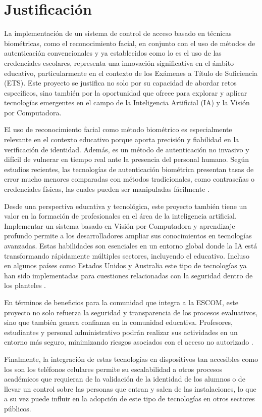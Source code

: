 

\section{Justificación}

La implementación de un sistema de control de acceso basado en técnicas biométricas, como el reconocimiento facial, en conjunto con el uso de métodos de autenticación convencionales y ya establecidos como lo es el uso de las credenciales escolares, representa una innovación significativa en el ámbito educativo, particularmente en el contexto de los Exámenes a Título de Suficiencia (ETS). Este proyecto se justifica no solo por su capacidad de abordar retos específicos, sino también por la oportunidad que ofrece para explorar y aplicar tecnologías emergentes en el campo de la Inteligencia Artificial (IA) y la Visión por Computadora.

El uso de reconocimiento facial como método biométrico es especialmente relevante en el contexto educativo porque aporta precisión y fiabilidad en la verificación de identidad. Además, es un método de autenticación no invasivo y difícil de vulnerar en tiempo real ante la presencia del personal humano. Según estudios recientes, las tecnologías de autenticación biométrica presentan tasas de error mucho menores comparadas con métodos tradicionales, como contraseñas o credenciales físicas, las cuales pueden ser manipuladas fácilmente \cite{L06}.

Desde una perspectiva educativa y tecnológica, este proyecto también tiene un valor en la formación de profesionales en el área de la inteligencia artificial. Implementar un sistema basado en Visión por Computadora y aprendizaje profundo permite a los desarrolladores ampliar sus conocimientos en tecnologías avanzadas. Estas habilidades son esenciales en un entorno global donde la IA está transformando rápidamente múltiples sectores, incluyendo el educativo. Incluso en algunos países como Estados Unidos y Australia este tipo de tecnologías ya han sido implementadas para cuestiones relacionadas con la seguridad dentro de los planteles \cite{L04}.

En términos de beneficios para la comunidad que integra a la ESCOM, este proyecto no solo refuerza la seguridad y transparencia de los procesos evaluativos, sino que también genera confianza en la comunidad educativa. Profesores, estudiantes y personal administrativo podrán realizar sus actividades en un entorno más seguro, minimizando riesgos asociados con el acceso no autorizado \cite{L05}. 

Finalmente, la integración de estas tecnologías en dispositivos tan accesibles como los son los teléfonos celulares permite su escalabilidad a otros procesos académicos que requieran de la validación de la identidad de los alumnos o de llevar un control sobre las personas que entran y salen de las instalaciones, lo que a su vez puede influir en la adopción de este tipo de tecnologías en otros sectores públicos. 
